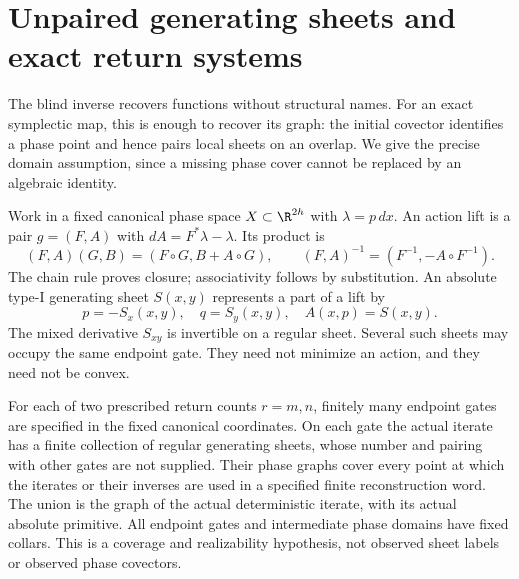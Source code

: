 \section{Unpaired generating sheets and exact return systems}
\label{sec:v81-geometry}

The blind inverse recovers functions without structural names.  For an
exact symplectic map, this is enough to recover its graph: the initial
covector identifies a phase point and hence pairs local sheets on an
overlap.  We give the precise domain assumption, since a missing phase
cover cannot be replaced by an algebraic identity.

Work in a fixed canonical phase space $X\subset\R^{2h}$ with
$\lambda=p\,dx$.  An action lift is a pair $g=(F,A)$ with
$dA=F^*\lambda-\lambda$.  Its product is
\begin{equation}\label{eq:v81-lift}
 (F,A)(G,B)=(F\circ G,B+A\circ G),\qquad
 (F,A)^{-1}=(F^{-1},-A\circ F^{-1}).
\end{equation}
The chain rule proves closure; associativity follows by substitution.
An absolute type-I generating sheet $S(x,y)$ represents a part of a
lift by
\begin{equation}\label{eq:v81-sheet}
 p=-S_x(x,y),\quad q=S_y(x,y),\quad A(x,p)=S(x,y).
\end{equation}
The mixed derivative $S_{xy}$ is invertible on a regular sheet.  Several
such sheets may occupy the same endpoint gate.  They need not minimize
an action, and they need not be convex.

\begin{definition}
\label{def:v81-cover}
For each of two prescribed return counts $r=m,n$, finitely many endpoint
gates are specified in the fixed canonical coordinates.  On each gate
the actual iterate has a finite collection of regular generating sheets,
whose number and pairing with other gates are not supplied.  Their
phase graphs cover every point at which the iterates or their inverses
are used in a specified finite reconstruction word.  The union is the
graph of the actual deterministic iterate, with its actual absolute
primitive.  All endpoint gates and intermediate phase domains have
fixed collars.  This is a coverage and realizability hypothesis, not
observed sheet labels or observed phase covectors.
\end{definition}


